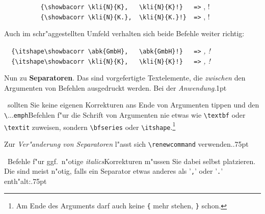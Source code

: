 \documentclass[12pt,a4paper]{article}
\newcommand{\pdfko}[1]{\kern #1pt
                          \strut\ignorespaces}%
\begin{document}
\vspace{1ex}\noindent
{\small\verb|          {\showbacorr \kli{N}{K},   \kli{N}{K}!}   =>|}
{\renewcommand{\kxxemph}{\itshape}\notprinthints\showbacorr{}, !}
\\
{\small\verb|          {\showbacorr \kli{N}{K.},  \kli{N}{K.}!}  =>|}
{\renewcommand{\kxxemph}{\itshape}\notprinthints\showbacorr{}, !}

\vspace{1.25ex}\noindent
Auch im schr"aggestellten Umfeld verhalten sich beide Befehle weiter richtig:

\vspace{1.1ex}\noindent
{\small\verb|  {\itshape\showbacorr \abk{GmbH},   \abk{GmbH}!}   =>|} 
{\itshape\renewcommand{\abkemph}{\itshape}\showbacorr{}, !}\\
{\small\verb|  {\itshape\showbacorr \kli{N}{K},   \kli{N}{K}!}   =>|}
{\itshape\renewcommand{\kxxemph}{\itshape}\notprinthints\showbacorr{}, !}

\vspace{4ex}\noindent
Nun zu \textbf{Separatoren}. Das sind vorgefertigte Textelemente, 
die \textit{zwischen} den Argumenten von \BibArts\hy Befehlen 
ausgedruckt werden. Bei der \textit{Anwendung}\pdfko{.1}\
sollten Sie keine eigenen Korrekturen ans Ende von \BibArts\hy Argumenten tippen 
und den \verb|\|...\verb|emph|\hy Befehlen f"ur die Schrift von \BibArts\hy 
Argumenten nie etwas wie \verb|\textbf| oder \verb|\textit| zuweisen, sondern 
\verb|\bfseries| oder \verb|\itshape|.\footnote{Am Ende des Arguments darf auch 
keine \texttt{\{} mehr stehen, \texttt{\}} schon.} 

Zur \textit{Ver"anderung von Separatoren} l"asst sich \verb|\renewcommand| 
verwenden.\pdfko{.75}\ 
Befehle f"ur ggf.\ n"otige \textit{italics}\hy Korrekturen m"ussen Sie 
dabei selbst platzieren. Die sind meist n"otig, falls ein Separator etwas 
anderes als '\texttt{,}' oder '\texttt{.}' enth"alt:\pdfko{.75}
\end{document}
